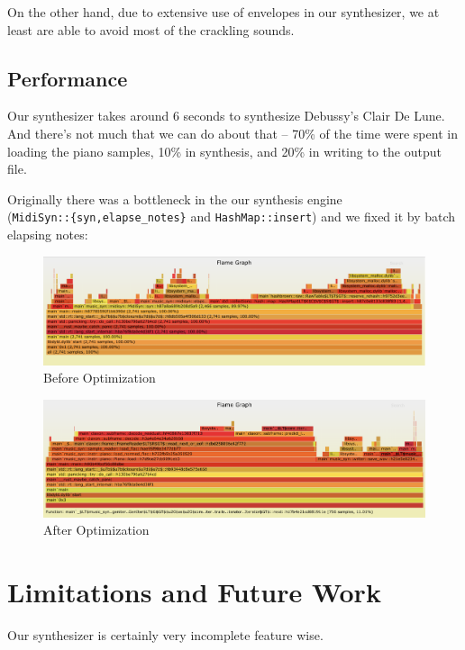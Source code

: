 \documentclass{article}
\begin{document}
On the other hand, due to extensive use of envelopes in our synthesizer,
we at least are able to avoid most of the crackling sounds.

\subsection{Performance}

Our synthesizer takes around 6 seconds to synthesize Debussy's Clair De Lune.
And there's not much that we can do about that --
70\% of the time were spent in loading the piano samples, 10\% in synthesis,
and 20\% in writing to the output file.

Originally there was a bottleneck in the our synthesis engine\\
(\texttt{MidiSyn::\{syn,elapse\_notes\}} and \texttt{HashMap::insert})
and we fixed it by batch elapsing notes:

\begin{figure}[ht]
  \centering
  \includegraphics[page=1,width=\textwidth]{../perf/slow.png}
  \caption{Before Optimization}
\end{figure}

\begin{figure}[ht]
  \centering
  \includegraphics[page=1,width=\textwidth]{../perf/opt.png}
  \caption{After Optimization}
\end{figure}

\section{Limitations and Future Work}

Our synthesizer is certainly very incomplete feature wise.
\end{document}

